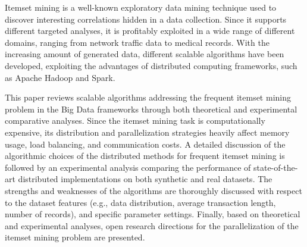 Itemset mining is a well-known exploratory data mining technique used to
discover interesting correlations hidden in a data collection. Since it supports
different targeted analyses, it is profitably exploited in a wide range of
different domains, ranging from network traffic data to medical records. With
the increasing amount of generated data, different scalable algorithms have been
developed, exploiting the advantages of distributed computing
frameworks, such as Apache Hadoop and Spark.


This paper reviews scalable algorithms addressing the frequent itemset mining 
problem in the Big Data frameworks through both theoretical and experimental 
comparative analyses. 
Since the itemset mining task is computationally expensive, its distribution and 
parallelization strategies heavily affect memory usage, load balancing, 
and communication costs.  
A detailed discussion of the algorithmic choices of the  
distributed methods for frequent itemset mining is followed by an experimental 
analysis comparing the performance of state-of-the-art distributed implementations on both 
synthetic and real datasets. 
The strengths and weaknesses of the algorithms are
thoroughly discussed with respect 
to the dataset features (e.g., data distribution, average 
transaction length, number of records), 
and specific parameter settings. 
Finally, based on theoretical and experimental analyses, open 
research directions for the parallelization of the itemset mining problem 
are presented.


%
